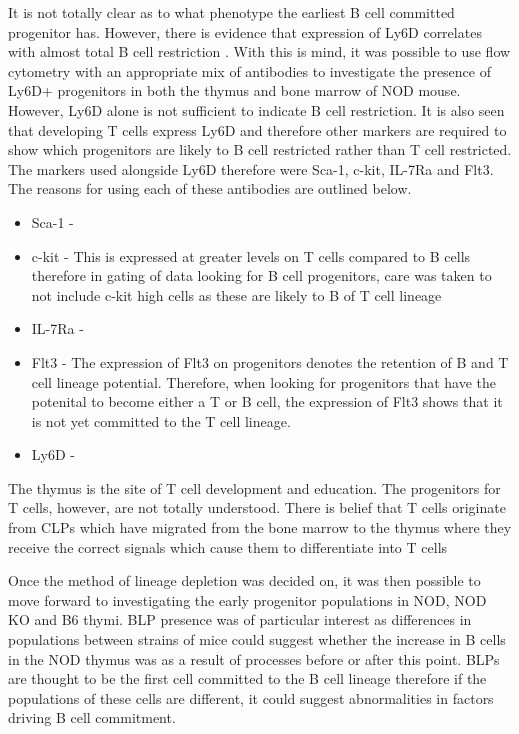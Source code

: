 

 It is not totally clear as to what phenotype the earliest B cell committed progenitor has. 
 However, there is evidence that expression of Ly6D correlates with almost total B cell restriction .
 With this is mind, it was possible to use flow cytometry with an appropriate mix of antibodies to investigate the presence of Ly6D+ progenitors in both the thymus and bone marrow of NOD mouse.
However, Ly6D alone is not sufficient to indicate B cell restriction. 
It is also seen that developing T cells express Ly6D and therefore other markers are required to show which progenitors are likely to B cell restricted rather than T cell restricted.
The markers used alongside Ly6D therefore were Sca-1, c-kit, IL-7Ra and Flt3. 
The reasons for using each of these antibodies are outlined below.
\begin{itemize}
\item Sca-1 - 
\item c-kit - This is expressed at greater levels on T cells compared to B cells therefore in gating of data looking for B cell progenitors, care was taken to not include c-kit high cells as these are likely to B of T cell lineage  
\item IL-7Ra - 
\item Flt3 - The expression of Flt3 on progenitors denotes the retention of B and T cell lineage potential. Therefore, when looking for progenitors that have the potenital to become either a T or B cell, the expression of Flt3 shows that it is not yet committed to the T cell lineage.
\item Ly6D - 
\end{itemize}




The thymus is the site of T cell development and education.
The progenitors for T cells, however, are not totally understood. 
There is belief that T cells originate from CLPs which have migrated from the bone marrow to the thymus where they receive the correct signals which cause them to differentiate into T cells

Once the method of lineage depletion was decided on, it was then possible to move forward to investigating the early progenitor populations in NOD, NOD KO and B6 thymi.
BLP presence was of particular interest as differences in populations between strains of mice could suggest whether the increase in B cells in the NOD thymus was as a result of processes before or after this point.
BLPs are thought to be the first cell committed to the B cell lineage therefore if the populations of these cells are different, it could suggest abnormalities in factors driving B cell commitment.

